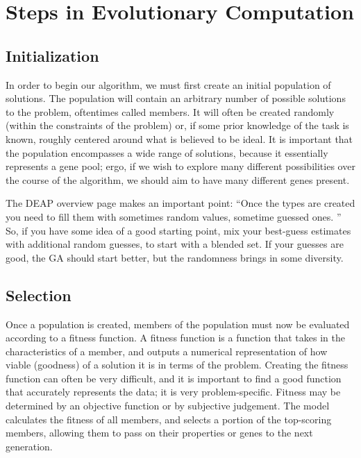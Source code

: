\section{Steps in Evolutionary Computation}
\subsection{Initialization}
In order to begin our algorithm, we must first create an initial population of solutions. The population will contain an arbitrary number of possible solutions to the problem, oftentimes called members. It will often be created randomly (within the constraints of the problem) or, if some prior knowledge of the task is known, roughly centered around what is believed to be ideal. It is important that the population encompasses a wide range of solutions, because it essentially represents a gene pool; ergo, if we wish to explore many different possibilities over the course of the algorithm, we should aim to have many different genes present.

The DEAP \cite{DEAPDocs2019} overview page makes an important point:  ``Once the types are created you need to fill them with sometimes random values, sometime guessed ones. '' So, if you have some idea of a good starting point, mix your best-guess estimates with  additional random guesses, to start with a blended set.  If your guesses are good, the GA should start better, but the randomness brings in some diversity. 

\subsection{Selection}
Once a population is created, members of the population must now be evaluated according to a fitness function. A fitness function is a function that takes in the characteristics of a member, and outputs a numerical representation of how viable (goodness) of a solution it is in terms of the problem. Creating the fitness function can often be very difficult, and it is important to find a good function that accurately represents the data; it is very problem-specific. Fitness may be determined by an objective function or by
subjective judgement. The model calculates the fitness of all members, and selects a portion of the top-scoring members, allowing them to pass on their properties or genes to the next generation.

